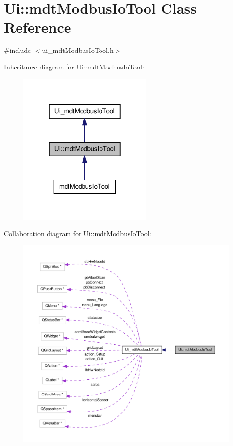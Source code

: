 \hypertarget{class_ui_1_1mdt_modbus_io_tool}{\section{Ui\-:\-:mdt\-Modbus\-Io\-Tool Class Reference}
\label{class_ui_1_1mdt_modbus_io_tool}
}


{\ttfamily \#include $<$ui\-\_\-mdt\-Modbus\-Io\-Tool.\-h$>$}



Inheritance diagram for Ui\-:\-:mdt\-Modbus\-Io\-Tool\-:\nopagebreak
\begin{figure}[H]
\begin{center}
\leavevmode
\includegraphics[width=190pt]{class_ui_1_1mdt_modbus_io_tool__inherit__graph}
\end{center}
\end{figure}


Collaboration diagram for Ui\-:\-:mdt\-Modbus\-Io\-Tool\-:\nopagebreak
\begin{figure}[H]
\begin{center}
\leavevmode
\includegraphics[width=350pt]{class_ui_1_1mdt_modbus_io_tool__coll__graph}
\end{center}
\end{figure}
